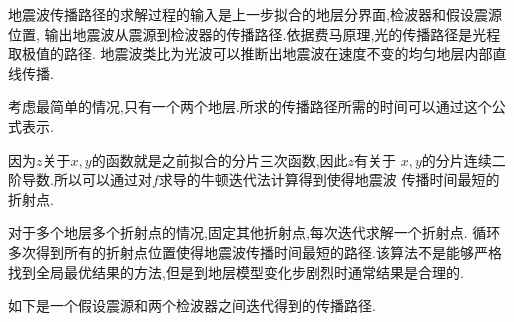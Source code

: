 \documentclass[UTF8]{ctexbeamer}	%
\theoremstyle{plain}
\theoremstyle{definition}
\theoremstyle{remark}
\numberwithin{equation}{section}
\begin{document}
\begin{frame}
    地震波传播路径的求解过程的输入是上一步拟合的地层分界面,检波器和假设震源位置,
    输出地震波从震源到检波器的传播路径.依据费马原理,光的传播路径是光程取极值的路径.
    地震波类比为光波可以推断出地震波在速度不变的均匀地层内部直线传播.

    考虑最简单的情况,只有一个两个地层.所求的传播路径所需的时间可以通过这个公式表示.
\end{frame}

\begin{frame}
    因为$z$关于$x,y$的函数就是之前拟合的分片三次函数,因此$z$有关于
          $x,y$的分片连续二阶导数.所以可以通过对$f$求导的牛顿迭代法计算得到使得地震波
          传播时间最短的折射点.

          对于多个地层多个折射点的情况,固定其他折射点,每次迭代求解一个折射点.
          循环多次得到所有的折射点位置使得地震波传播时间最短的路径.该算法不是能够严格
          找到全局最优结果的方法,但是到地层模型变化步剧烈时通常结果是合理的.

          如下是一个假设震源和两个检波器之间迭代得到的传播路径.
\end{frame}


\end{document}
